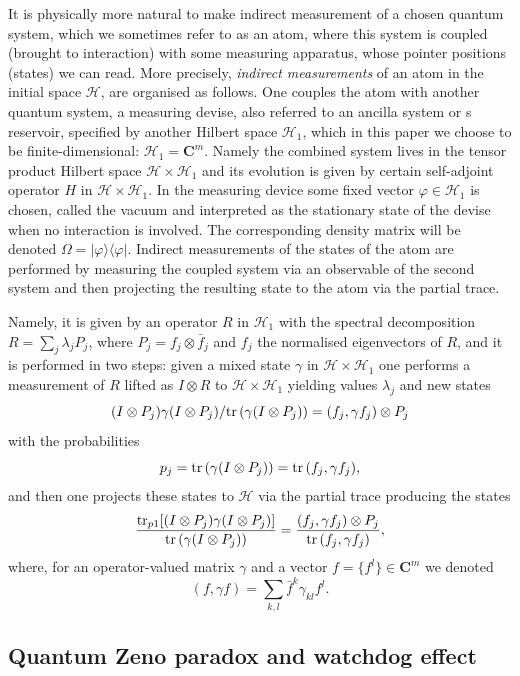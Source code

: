 \documentclass[12pt]{article}
\def\HC{\mathcal{H}}
\def\C{\mathbf{C}}
\def\tr{\rm{tr}}
\def\ga{\gamma}
\newcommand{\la}{\lambda}
\newcommand{\Om}{\Omega}
\begin{document}
It is physically more natural to make indirect measurement of a chosen quantum system,
which we sometimes refer to as an atom, where this system is coupled (brought to interaction) with
some measuring apparatus, whose pointer positions (states) we can read.  More precisely,
{\it indirect measurements} of an atom in the initial space $\HC$,
are organised as follows.
One couples the atom with another quantum system, a measuring devise,
also referred to an ancilla system or s reservoir, specified
by another Hilbert space $\HC_1$, which in this paper we choose to be finite-dimensional: $\HC_1=\C^m$.
 Namely the combined system lives in the tensor product
 Hilbert space $\HC\times \HC_1$ and its evolution is given by  certain self-adjoint
 operator $H$ in  $\HC\times \HC_1$. In the measuring device some fixed vector $\varphi \in \HC_1$
 is chosen, called the vacuum and interpreted as the stationary state of the devise when
 no interaction is involved. The corresponding density matrix will be denoted $\Om=|\varphi \rangle \langle \varphi|$.
 Indirect measurements of the states of the atom
 are performed by measuring the coupled system via an observable of the second system
 and then projecting the resulting state to the atom via the partial trace.

Namely, it is given by an operator $R$ in $\HC_1$ with the spectral decomposition
$R=\sum_j \la_j P_j$, where $P_j=f_j\otimes \bar f_j$ and $f_j$ the normalised eigenvectors of $R$,
 and it is performed in two steps: given a mixed state $\ga$ in  $\HC\times \HC_1$
one performs a measurement of $R$ lifted as $I\otimes R$ to $\HC\times \HC_1$
yielding values $\la_j$ and new states
\[
(I\otimes P_j)\ga (I\otimes P_j)/ {\tr} \, (\ga  (I\otimes P_j))=(f_j, \ga f_j) \otimes P_j
\]
with the probabilities
\[
p_j= {\tr} \, (\ga  (I\otimes P_j))={\tr} \, (f_j, \ga f_j),
\]
and then one projects these states to $\HC$
via the partial trace producing the states
\begin{equation}
\label{eqindirmeas}
\frac{{\tr}_{p1} [(I\otimes P_j)\ga (I\otimes P_j)]}{ {\tr} \, (\ga  (I\otimes P_j))}
=\frac{(f_j, \ga f_j) \otimes P_j}{{\tr}\, (f_j, \ga f_j)},
\end{equation}
where, for an operator-valued matrix $\ga$ and a vector $f=\{f^l\}\in \C^m$ we denoted
\[
(f,\ga f)=\sum_{k,l} \bar f^k\ga_{kl} f^l.
\]

\subsection{Quantum Zeno paradox and watchdog effect}
\end{document}
